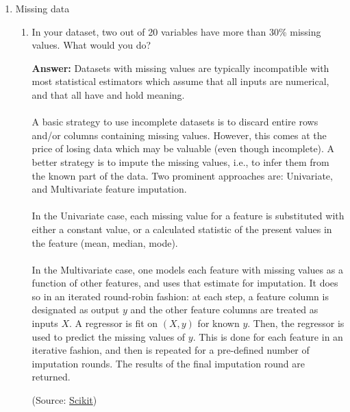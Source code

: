 \documentclass{article}
\newenvironment{QandA}{\begin{enumerate}[label=\arabic*.]}{\end{enumerate}}
\newenvironment{InnerQandA}{\begin{enumerate}[label=\roman*.]}{\end{enumerate}}
\newenvironment{answer}{\par\normalfont \textbf{Answer:}}{}
\begin{document}
\begin{QandA}
    \item Missing data
    \begin{InnerQandA}
        \item In your dataset, two out of 20 variables have more than 30\% missing values. What would you do?
        \begin{answer}
            Datasets with missing values are typically incompatible with most statistical estimators which assume that all inputs are numerical, and that all have and hold meaning. \\\\
            A basic strategy to use incomplete datasets is to discard entire rows and/or columns containing missing values. However, this comes at the price of losing data which may be valuable (even though incomplete). A better strategy is to impute the missing values, i.e., to infer them from the known part of the data. Two prominent approaches are: Univariate, and Multivariate feature imputation. \\\\
            In the Univariate case, each missing value for a feature is substituted with either a constant value, or a calculated statistic of the present values in the feature (mean, median, mode). \\\\
            In the Multivariate case, one models each feature with missing values as a function of other features, and uses that estimate for imputation. It does so in an iterated round-robin fashion: at each step, a feature column is designated as output $y$ and the other feature columns are treated as inputs $X$. A regressor is fit on $(X, y)$ for known $y$. Then, the regressor is used to predict the missing values of $y$. This is done for each feature in an iterative fashion, and then is repeated for a pre-defined number of imputation rounds. The results of the final imputation round are returned.

            (Source: \href{https://scikit-learn.org/stable/modules/impute.html}{Scikit})
        \end{answer}


\end{InnerQandA}
\end{QandA}
\end{document}
